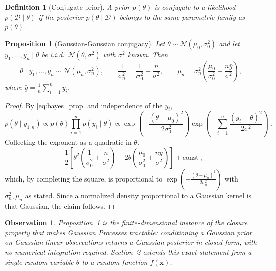 \documentclass{article}
\newtheorem{prop}{Proposition}
\newtheorem{defn}{Definition}
\newtheorem{obs}{Observation}
\begin{document}
	\begin{defn}[Conjugate prior]
		A prior $p(\theta)$ is \textit{conjugate} to a likelihood $p(\mathcal{D} \mid \theta)$ if the posterior $p(\theta \mid \mathcal{D})$ belongs to the same parametric family as $p(\theta)$.
	\end{defn}
	
	\begin{prop}[Gaussian-Gaussian conjugacy] \label{prop:gauss_conj}
		Let $\theta \sim \mathcal{N}(\mu_0, \sigma_0^2)$ and let $y_1, \dots, y_n \mid \theta$ be i.i.d.\ $\mathcal{N}(\theta, \sigma^2)$ with $\sigma^2$ known. Then
		\begin{equation}
			\theta \mid y_1, \dots, y_n \sim \mathcal{N}(\mu_n, \sigma_n^2), 
			\qquad 
			\frac{1}{\sigma_n^2} = \frac{1}{\sigma_0^2} + \frac{n}{\sigma^2}, 
			\qquad 
			\mu_n = \sigma_n^2 \left( \frac{\mu_0}{\sigma_0^2} + \frac{n \bar{y}}{\sigma^2} \right),
		\end{equation}
		where $\bar{y} = \frac{1}{n}\sum_{i=1}^n y_i$.
	\end{prop}
	\begin{proof}
		By \eqref{eq:bayes_prop} and independence of the $y_i$,
		\begin{equation}
			p(\theta \mid y_{1:n}) \propto p(\theta) \prod_{i=1}^n p(y_i \mid \theta) \propto \exp\left(-\frac{(\theta-\mu_0)^2}{2\sigma_0^2}\right) \exp\left(-\sum_{i=1}^n \frac{(y_i-\theta)^2}{2\sigma^2}\right) \ .
		\end{equation}
		Collecting the exponent as a quadratic in $\theta$,
		\begin{equation}
			-\frac{1}{2}\left[ \theta^2 \left(\frac{1}{\sigma_0^2} + \frac{n}{\sigma^2}\right) - 2\theta\left(\frac{\mu_0}{\sigma_0^2} + \frac{n\bar y}{\sigma^2}\right) \right] + \text{const} \ ,
		\end{equation}
		which, by completing the square, is proportional to $\exp\left(-\frac{(\theta - \mu_n)^2}{2\sigma_n^2}\right)$ with $\sigma_n^2, \mu_n$ as stated. Since a normalized density proportional to a Gaussian kernel is that Gaussian, the claim follows.
	\end{proof}
	
	\begin{obs}
		Proposition~\ref{prop:gauss_conj} is the finite-dimensional instance of the closure property that makes Gaussian Processes tractable: conditioning a Gaussian prior on Gaussian-linear observations returns a Gaussian posterior in closed form, with no numerical integration required. Section~2 extends this exact statement from a single random variable $\theta$ to a random \textit{function} $f(\mathbf{x})$.
	\end{obs}
	
\end{document}
